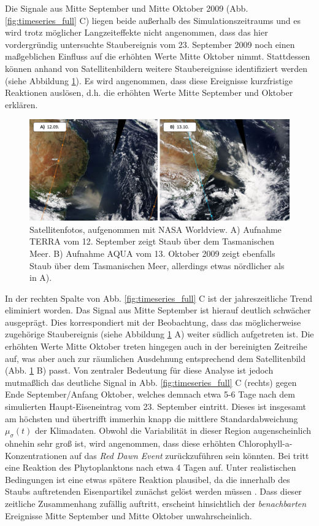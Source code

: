 \documentclass[12pt,a4paper,onecolumn]{scrartcl}
\begin{document}
Die Signale aus Mitte September und Mitte Oktober 2009 (Abb. \ref{fig:timeseries_full} C) liegen beide außerhalb des Simulationszeitraums und es wird trotz möglicher Langzeiteffekte \citep{Boyd.2010} nicht angenommen, dass das hier vordergründig untersuchte Staubereignis vom 23. September 2009 noch einen maßgeblichen Einfluss auf die erhöhten Werte Mitte Oktober nimmt. Stattdessen können anhand von Satellitenbildern weitere Staubereignisse identifiziert werden (siehe Abbildung \ref{fig:duststorms_surrounding}). Es wird angenommen, dass diese Ereignisse kurzfristige Reaktionen auslösen, d.h. die erhöhten Werte Mitte September und Oktober erklären. 
\begin{figure}[!htb]
\includegraphics[width=\textwidth]{bilder/duststorms_surround.png}
\caption{Satellitenfotos, aufgenommen mit NASA Worldview. A) Aufnahme TERRA vom 12. September zeigt Staub über dem Tasmanischen Meer. B) Aufnahme AQUA vom 13. Oktober 2009 zeigt ebenfalls Staub über dem Tasmanischen Meer, allerdings etwas nördlicher als in A). } \label{fig:duststorms_surrounding}
\end{figure}
In der rechten Spalte von Abb. \ref{fig:timeseries_full} C ist der jahreszeitliche Trend eliminiert worden. Das Signal aus Mitte September ist hierauf deutlich schwächer ausgeprägt. Dies korrespondiert mit der Beobachtung, dass das möglicherweise zugehörige Staubereignis (siehe Abbildung \ref{fig:duststorms_surrounding} A) weiter südlich aufgetreten ist. Die erhöhten Werte Mitte Oktober treten hingegen auch in der bereinigten Zeitreihe auf, was aber auch zur räumlichen Ausdehnung entsprechend dem Satellitenbild (Abb. \ref{fig:duststorms_surrounding} B) passt. Von zentraler Bedeutung für diese Analyse ist jedoch mutmaßlich das deutliche Signal in Abb. \ref{fig:timeseries_full} C (rechts) gegen Ende September/Anfang Oktober, welches demnach etwa 5-6 Tage nach dem simulierten Haupt-Eiseneintrag vom 23. September eintritt. Dieses ist insgesamt am höchsten und übertrifft immerhin knapp die mittlere Standardabweichung $\mu_\sigma(t)$ der Klimadaten. Obwohl die Variabilität in dieser Region augenscheinlich ohnehin sehr groß ist, wird angenommen, dass diese erhöhten Chlorophyll-a-Konzentrationen auf das \textit{Red Dawn Event} zurückzuführen sein könnten. Bei \citet{Martin.1988} tritt eine Reaktion des Phytoplanktons nach etwa 4 Tagen auf. Unter realistischen Bedingungen ist eine etwas spätere Reaktion plausibel, da die innerhalb des Staubs auftretenden Eisenpartikel zunächst gelöst werden müssen \citep{Shao.2011}. Dass dieser zeitliche Zusammenhang zufällig auftritt, erscheint hinsichtlich der \textit{benachbarten} Ereignisse Mitte September und Mitte Oktober unwahrscheinlich. \\
\end{document}
